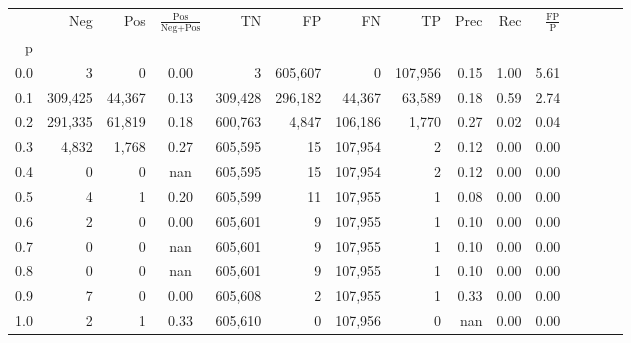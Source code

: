 \begin{tabular}{rrrcrrrrrrrrrrr}
\toprule
{} &      Neg &     Pos & $\frac{\text{Pos}}{\text{Neg}+\text{Pos}}$ &       TN &       FP &       FN &       TP &  Prec &   Rec & $\frac{\text{FP}}{\text{P}}$ \\
p   &          &         &                                            &          &          &          &          &       &       &                              \\
\midrule
0.0 &        3 &       0 &                                       0.00 &        3 &  605,607 &        0 &  107,956 &  0.15 &  1.00 &                         5.61 \\
0.1 &  309,425 &  44,367 &                                       0.13 &  309,428 &  296,182 &   44,367 &   63,589 &  0.18 &  0.59 &                         2.74 \\
0.2 &  291,335 &  61,819 &                                       0.18 &  600,763 &    4,847 &  106,186 &    1,770 &  0.27 &  0.02 &                         0.04 \\
0.3 &    4,832 &   1,768 &                                       0.27 &  605,595 &       15 &  107,954 &        2 &  0.12 &  0.00 &                         0.00 \\
0.4 &        0 &       0 &                                        nan &  605,595 &       15 &  107,954 &        2 &  0.12 &  0.00 &                         0.00 \\
0.5 &        4 &       1 &                                       0.20 &  605,599 &       11 &  107,955 &        1 &  0.08 &  0.00 &                         0.00 \\
0.6 &        2 &       0 &                                       0.00 &  605,601 &        9 &  107,955 &        1 &  0.10 &  0.00 &                         0.00 \\
0.7 &        0 &       0 &                                        nan &  605,601 &        9 &  107,955 &        1 &  0.10 &  0.00 &                         0.00 \\
0.8 &        0 &       0 &                                        nan &  605,601 &        9 &  107,955 &        1 &  0.10 &  0.00 &                         0.00 \\
0.9 &        7 &       0 &                                       0.00 &  605,608 &        2 &  107,955 &        1 &  0.33 &  0.00 &                         0.00 \\
1.0 &        2 &       1 &                                       0.33 &  605,610 &        0 &  107,956 &        0 &   nan &  0.00 &                         0.00 \\
\bottomrule
\end{tabular}
